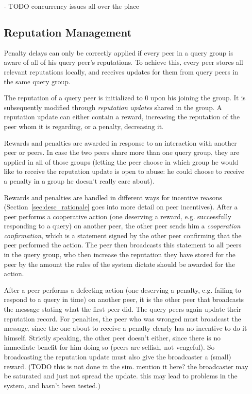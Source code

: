 - TODO concurrency issues all over the place

\subsection{Reputation Management}
\label{sec:desc_rep_management}
Penalty delays can only be correctly applied if every peer in a query group is
aware of all of his query peer's reputations. To achieve this, every peer stores
all relevant reputations locally, and receives updates for them from query peers
in the same query group.

The reputation of a query peer is initialized to 0 upon his joining the group.
It is subsequently modified through \emph{reputation updates} shared in the
group. A reputation update can either contain a reward, increasing the
reputation of the peer whom it is regarding, or a penalty, decreasing it.

Rewards and penalties are awarded in response to an interaction with another
peer or peers. In case the two peers share more than one query group, they are
applied in all of those groups (letting the peer choose in which group he would
like to receive the reputation update is open to abuse: he could choose to
receive a penalty in a group he doesn't really care about).

Rewards and penalties are handled in different ways for incentive reasons
(Section~\ref{sec:desc_rationale} goes into more detail on peer incentives).
After a peer performs a cooperative action (one deserving a reward, e.g.
successfully responding to a query) on another peer, the other peer sends him a
\emph{cooperation confirmation}, which is a statement signed by the other peer
confirming that the peer performed the action. The peer then broadcasts this
statement to all peers in the query group, who then increase the reputation they
have stored for the peer by the amount the rules of the system dictate should be
awarded for the action.

After a peer performs a defecting action (one deserving a penalty, e.g. failing
to respond to a query in time) on another peer, it is the other peer that
broadcasts the message stating what the first peer did. The query peers again
update their reputation record. For penalties, the peer who was wronged must
broadcast the message, since the one about to receive a penalty clearly has no
incentive to do it himself. Strictly speaking, the other peer doesn't either,
since there is no immediate benefit for him doing so (peers are selfish, not
vengeful). So broadcasting the reputation update must also give the broadcaster
a (small) reward. (TODO this is not done in the sim. mention it here? the
broadcaster may be saturated and just not spread the update. this may lead to
problems in the system, and hasn't been tested.)

